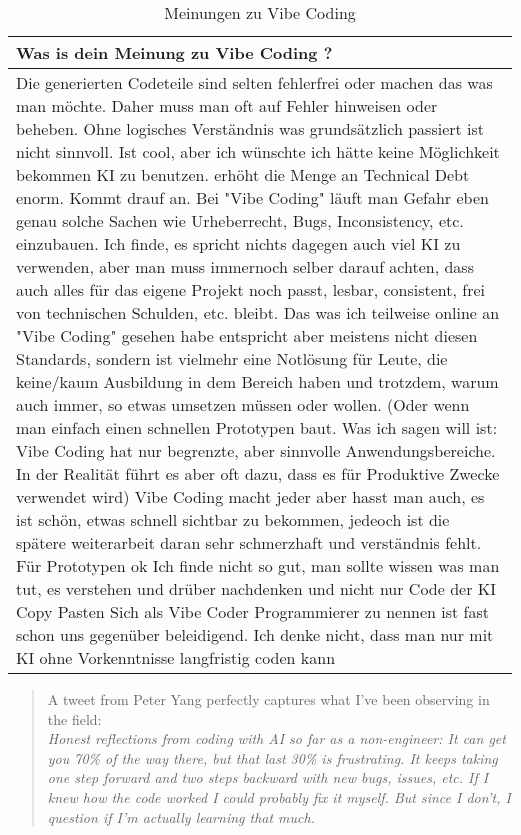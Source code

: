 \documentclass[paper=a4,fontsize=12pt,ngerman]{scrartcl}
\begin{document}
\begin{table}[H]
   \centering
   \begin{longtable}{p{8cm}} 
    \toprule
    \textbf{Was is dein Meinung zu Vibe Coding ?} \\
    \midrule
    Die generierten Codeteile sind selten fehlerfrei oder machen das was man möchte. Daher muss man oft 
    auf Fehler hinweisen oder beheben. Ohne logisches Verständnis was grundsätzlich passiert ist nicht 
    sinnvoll.
    \midrule
    Ist cool, aber ich wünschte ich hätte keine Möglichkeit bekommen KI zu benutzen.
    \midrule
    erhöht die Menge an Technical Debt enorm. 
    \midrule
    Kommt drauf an. Bei "Vibe Coding" läuft man Gefahr eben genau solche Sachen wie Urheberrecht, Bugs, Inconsistency, etc. einzubauen. 
    Ich finde, es spricht nichts dagegen auch viel KI zu verwenden, aber man muss immernoch selber darauf achten, dass auch alles für das eigene Projekt noch passt, lesbar, consistent, frei von technischen Schulden, etc. bleibt. 
    Das was ich teilweise online an "Vibe Coding" gesehen habe entspricht aber meistens nicht diesen Standards, sondern ist vielmehr eine Notlösung für Leute, die keine/kaum Ausbildung in dem Bereich haben und trotzdem, warum auch immer, so etwas umsetzen müssen oder wollen. 
    (Oder wenn man einfach einen schnellen Prototypen baut. Was ich sagen will ist: Vibe Coding hat nur begrenzte, aber sinnvolle Anwendungsbereiche. 
    In der Realität führt es aber oft dazu, dass es für Produktive Zwecke verwendet wird)
    \midrule
    Vibe Coding macht jeder aber hasst man auch, es ist schön, etwas schnell sichtbar zu bekommen, jedeoch 
    ist die spätere weiterarbeit daran sehr schmerzhaft und verständnis fehlt. Für Prototypen ok 
    \midrule
    Ich finde nicht so gut, man sollte wissen was man tut, es verstehen und drüber nachdenken und nicht nur 
    Code der KI Copy Pasten 
    \midrule
    Sich als Vibe Coder Programmierer zu nennen ist fast schon uns gegenüber beleidigend. 
    \midrule
    Ich denke nicht, dass man nur mit KI ohne Vorkenntnisse langfristig coden kann
    \end{longtable}
    \caption{Meinungen zu Vibe Coding}
    \label{tab:meinungen}
\end{table}



\begin{quote}
A tweet from Peter Yang perfectly captures what I’ve been observing in the field: \\
\textit{Honest reflections from coding with AI so far as a non-engineer: It can get you 70\% of the way there, but that last 30\% is frustrating. It keeps taking one step forward and two steps backward with new bugs, issues, etc. If I knew how the code worked I could probably fix it myself. But since I don’t, I question if I’m actually learning that much.}
\citep{VibeCodingTheFutureOfProgramming}
\end{quote}
\end{document}
